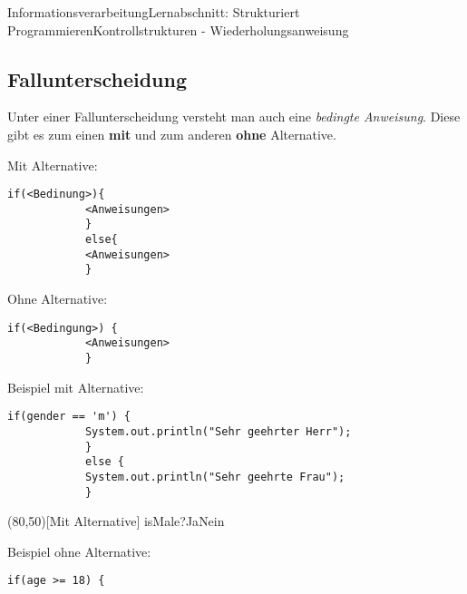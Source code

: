 \documentclass[11pt,oneside,openany,headings=optiontotoc,11pt,numbers=noenddot]{article}
\begin{document}
\begin{worksheet}{Informationsverarbeitung}{Lernabschnitt: Strukturiert Programmieren}{Kontrollstrukturen - Wiederholungsanweisung}
		\subsection{Fallunterscheidung}
		Unter einer Fallunterscheidung versteht man auch eine \textit{bedingte Anweisung}. Diese gibt es zum einen \textbf{mit} und zum anderen \textbf{ohne} Alternative.\\
		\begin{minipage}[t]{0.48\textwidth}
			\vspace*{0pt}
			Mit Alternative:
			\begin{lstlisting}[style=JavaInputStyle]
			if(<Bedinung>){
			<Anweisungen>
			}
			else{
			<Anweisungen>
			}
			\end{lstlisting}
		\end{minipage}
		\hfill
		\begin{minipage}[t]{0.48\textwidth}
			\vspace*{0pt}
			Ohne Alternative:
			\begin{lstlisting}[style=JavaInputStyle]
			if(<Bedingung>) {
			<Anweisungen>
			}
			\end{lstlisting}
		\end{minipage}
		\par\noindent
		\begin{minipage}[t]{0.48\textwidth}
			\vspace*{0pt}
			Beispiel mit Alternative:
			\begin{lstlisting}[style=JavaInputStyle,frame=single]
			if(gender == 'm') {
			System.out.println("Sehr geehrter Herr");
			}
			else {
			System.out.println("Sehr geehrte Frau");
			}
			\end{lstlisting}
		\end{minipage}
		\hfill
		\begin{minipage}[t]{0.48\textwidth}
			\vspace*{0pt}
			\begin{struktogramm}(80,50)[Mit Alternative]
				{isMale?}{Ja}{Nein}
				\change
				\ifend
			\end{struktogramm}
		\end{minipage}
		\begin{minipage}[t]{0.48\textwidth}
			\vspace*{0pt}
			Beispiel ohne Alternative:
			\begin{lstlisting}[style=JavaInputStyle,frame=single]
			if(age >= 18) {

\end{lstlisting}
\end{minipage}
\end{worksheet}
\end{document}
